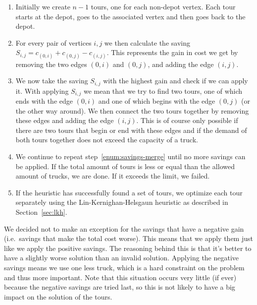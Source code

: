 \documentclass[titlepage, 12pt]{article}
\begin{document}
    \begin{enumerate}
        \itemsep 0em
        \item
            Initially we create $n - 1$ tours, one for each non-depot vertex. Each tour starts at
            the depot, goes to the associated vertex and then goes back to the depot.
        \item
            For every pair of vertices $i, j$ we then calculate the saving $S_{i, j} =
            c_{(0, i)} + c_{(0, j)} - c_{(i, j)}$. This represents the gain in cost we get by
            removing the two edges $(0, i)$ and $(0, j)$, and adding the edge $(i, j)$.
        \item
        \label{enum:savings-merge}
            We now take the saving $S_{i, j}$ with the highest gain and check if we can apply it.
            With applying $S_{i, j}$ we mean that we try to find two tours, one of which ends with
            the edge $(0, i)$ and one of which begins with the edge $(0, j)$ (or the other way
            around). We then connect the two tours together by removing these edges and adding the
            edge $(i, j)$.
            This is of course only possible if there are two tours that begin or end with these
            edges and if the demand of both tours together does not exceed the capacity of a truck.
        \item
            We continue to repeat step~\ref{enum:savings-merge} until no more savings can be
            applied. If the total amount of tours is less or equal than the allowed amount of
            trucks, we are done. If it exceeds the limit, we failed.
        \item
            If the heuristic has successfully found a set of tours, we optimize each tour separately
            using the Lin-Kernighan-Helsgaun heuristic as described in Section~\ref{sec:lkh}.
    \end{enumerate}

    We decided not to make an exception for the savings that have a negative gain (i.e.\ savings
    that make the total cost worse). This means that we apply them just like we apply the positive
    savings.
    The reasoning behind this is that it's better to have a slightly worse solution than an invalid
    solution. Applying the negative savings means we use one less truck, which is a hard constraint
    on the problem and thus more important.
    Note that this situation occurs very little (if ever) because the negative savings are tried
    last, so this is not likely to have a big impact on the solution of the tours.
\end{document}

